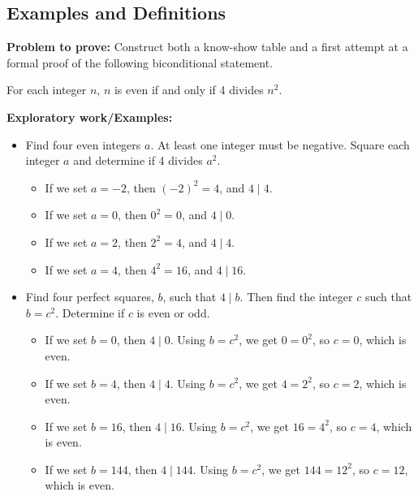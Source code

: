 \subsection{Examples and Definitions}

\textbf{Problem to prove:} Construct both a know-show table and a first attempt at a formal proof of the following biconditional statement.

\begin{prop}
    For each integer \( n \), \( n \) is even if and only if 4 divides \( n^2 \).
\end{prop}


\textbf{Exploratory work/Examples:}
\begin{itemize}
    \item Find four even integers \( a \). At least one integer must be negative. Square each integer \( a \) and determine if 4 divides \( a^2 \).
    \begin{itemize}
        \item If we set \( a = -2 \), then \( (-2)^2 = 4 \), and \( 4 \mid 4 \).
        \item If we set \( a = 0 \), then \( 0^2 = 0 \), and \( 4 \mid 0 \).
        \item If we set \( a = 2 \), then \( 2^2 = 4 \), and \( 4 \mid 4 \).
        \item If we set \( a = 4 \), then \( 4^2 = 16 \), and \( 4 \mid 16 \).
    \end{itemize}
    
    \item Find four perfect squares, \( b \), such that \( 4 \mid b \). Then find the integer \( c \) such that \( b = c^2 \). Determine if \( c \) is even or odd.
    \begin{itemize}
        \item If we set \( b = 0 \), then \( 4 \mid 0 \). Using \( b = c^2 \), we get \( 0 = 0^2 \), so \( c = 0 \), which is even.
        \item If we set \( b = 4 \), then \( 4 \mid 4 \). Using \( b = c^2 \), we get \( 4 = 2^2 \), so \( c = 2 \), which is even.
        \item If we set \( b = 16 \), then \( 4 \mid 16 \). Using \( b = c^2 \), we get \( 16 = 4^2 \), so \( c = 4 \), which is even.
        \item If we set \( b = 144 \), then \( 4 \mid 144 \). Using \( b = c^2 \), we get \( 144 = 12^2 \), so \( c = 12 \), which is even.
    \end{itemize}
\end{itemize}

